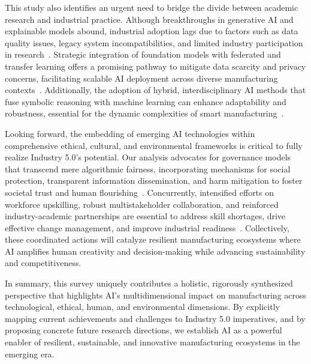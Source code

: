 \documentclass[sigconf]{acmart}
\begin{document}
This study also identifies an urgent need to bridge the divide between academic research and industrial practice. Although breakthroughs in generative AI and explainable models abound, industrial adoption lags due to factors such as data quality issues, legacy system incompatibilities, and limited industry participation in research~\cite{ref3,ref7}. Strategic integration of foundation models with federated and transfer learning offers a promising pathway to mitigate data scarcity and privacy concerns, facilitating scalable AI deployment across diverse manufacturing contexts~\cite{ref5,ref8}. Additionally, the adoption of hybrid, interdisciplinary AI methods that fuse symbolic reasoning with machine learning can enhance adaptability and robustness, essential for the dynamic complexities of smart manufacturing~\cite{ref35,ref37}.

Looking forward, the embedding of emerging AI technologies within comprehensive ethical, cultural, and environmental frameworks is critical to fully realize Industry 5.0’s potential. Our analysis advocates for governance models that transcend mere algorithmic fairness, incorporating mechanisms for social protection, transparent information dissemination, and harm mitigation to foster societal trust and human flourishing~\cite{ref25}. Concurrently, intensified efforts on workforce upskilling, robust multistakeholder collaboration, and reinforced industry-academic partnerships are essential to address skill shortages, drive effective change management, and improve industrial readiness~\cite{ref2,ref3,ref21}. Collectively, these coordinated actions will catalyze resilient manufacturing ecosystems where AI amplifies human creativity and decision-making while advancing sustainability and competitiveness.

In summary, this survey uniquely contributes a holistic, rigorously synthesized perspective that highlights AI’s multidimensional impact on manufacturing across technological, ethical, human, and environmental dimensions. By explicitly mapping current achievements and challenges to Industry 5.0 imperatives, and by proposing concrete future research directions, we establish AI as a powerful enabler of resilient, sustainable, and innovative manufacturing ecosystems in the emerging era.






\end{document}
